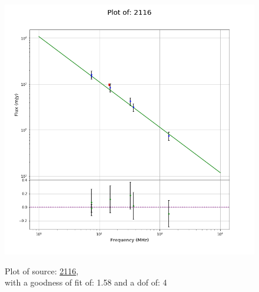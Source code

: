 \documentclass{article}
\begin{document}
\begin{figure}[H]
    \centering
    \begin{minipage}{.5\textwidth}
        \centering
        \includegraphics[scale = 0.35]{KmeulenTrap4P23_1hr/1hr2116.png}
        \captionsetup{labelformat=empty}
        \caption{Plot of source: \href{http://banana.transientskp.org/r4/vlo_KmeulenTrap4P23/runningcatalog/2116}{2116},\\with a goodness of fit of: 1.58 and a dof of: 4}
        \addtocounter{figure}{-1}
        \label{KmeulenTrap4P23:1hr:2116:plot}
    \end{minipage}%
    \begin{minipage}{0.5\textwidth}
        \centering


\end{minipage}
\end{figure}
\end{document}
